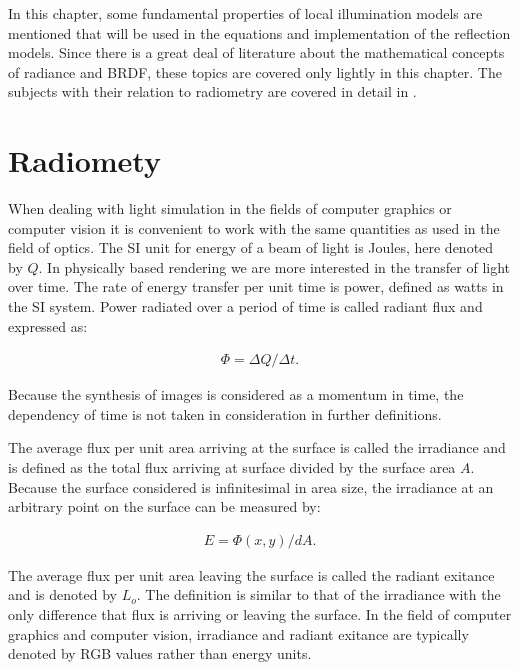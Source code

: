 \hypertarget{Fundamentals}{
}

In this chapter, some fundamental properties of local illumination models are mentioned that will be used in the equations and implementation of the reflection models. Since there is a great deal of literature about the mathematical concepts of radiance and BRDF, these topics are covered only lightly in this chapter. The subjects with their relation to radiometry are covered in detail in \cite{RTR} \cite{GlobalIllumination} \cite{DigitalModeling}.

\section{Radiomety}

When dealing with light simulation in the fields of computer graphics or computer vision it is convenient to work with the same quantities as used in the field of optics. The SI unit for energy of a beam of light is Joules, here denoted by $Q$. In physically based rendering we are more interested in the transfer of light over time. The rate of energy transfer per unit time is power, defined as watts in the SI system. Power radiated over a period of time is called radiant flux and expressed as: 

		\begin{eqnarray*}
			\Phi = \Delta Q / \Delta t. 
		\end{eqnarray*}

Because the synthesis of images is considered as a momentum in time, the dependency of time is not taken in consideration in further definitions.

The average flux per unit area arriving at the surface is called the irradiance and is defined as the total flux arriving at surface divided by the surface area $A$. Because the surface considered is infinitesimal in area size, the irradiance at an arbitrary point on the surface can be measured by:

		\begin{eqnarray*}
			E = \Phi(x,y) / dA. 
		\end{eqnarray*}

The average flux per unit area leaving the surface is called the radiant exitance and is denoted by $L_o$. The definition is similar to that of the irradiance with the only difference that flux is arriving or leaving the surface. In the field of computer graphics and computer vision, irradiance and radiant exitance are typically denoted by RGB values rather than energy units.


